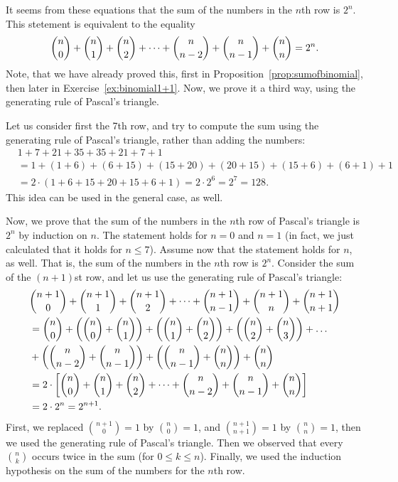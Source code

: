 It seems from these equations that the sum of the numbers in the $n$th row is $2^n$. 
This stetement is equivalent to the equality
\begin{equation} %
\notag \binom{n}{0} + \binom{n}{1} + \binom{n}{2} + \dots + \binom{n}{n-2} + \binom{n}{n-1} + \binom{n}{n} = 2^n. 
\end{equation}
Note, that we have already proved this, first in Proposition~\ref{prop:sumofbinomial}, then later in Exercise~\ref{ex:binomial1+1}.
Now, we prove it a third way, using the generating rule of Pascal's triangle. 

Let us consider first the 7th row, 
and try to compute the sum using the generating rule of Pascal's triangle, 
rather than adding the numbers: 
\begin{align*}
& 1 + 7 + 21 + 35 + 35 + 21 + 7 + 1 \\
&= 1 + (1 + 6) + (6 + 15) + (15 + 20) + (20 + 15) + (15 + 6) + (6 + 1) + 1 \\
&= 2 \cdot (1 + 6 + 15 + 20 + 15 + 6 + 1 ) = 2 \cdot 2^6 = 2^7 = 128. 
\end{align*}
This idea can be used in the general case, as well. 

Now, we prove that the sum of the numbers in the $n$th row of Pascal's triangle is $2^n$ by induction on $n$. 
The statement holds for $n=0$ and $n=1$ (in fact, we just calculated that it holds for $n\leq 7$). 
Assume now that the statement holds for $n$, as well. 
That is, the sum of the numbers in the $n$th row is $2^{n}$. 
Consider the sum of the $(n+1)$st row, 
and let us use the generating rule of Pascal's triangle: 
\begin{align}
\notag & \binom{n+1}{0} + \binom{n+1}{1} + \binom{n+1}{2} + \dots + \binom{n+1}{n-1} + \binom{n+1}{n} + \binom{n+1}{n+1} \\
\notag &= \binom{n}{0} + \left( \binom{n}{0} + \binom{n}{1} \right) + \left( \binom{n}{1} + \binom{n}{2} \right)  + \left( \binom{n}{2} + \binom{n}{3} \right) 
+ \dots \\
\notag &+ %
\left( \binom{n}{n-2} + \binom{n}{n-1} \right)  + \left( \binom{n}{n-1} + \binom{n}{n} \right) + \binom{n}{n} \\
\notag &= 2 \cdot \left[ \binom{n}{0} + \binom{n}{1} + \binom{n}{2} + \dots + \binom{n}{n-2} + \binom{n}{n-1} + \binom{n}{n} \right] \\
\notag &= 2 \cdot 2^{n} = 2^{n+1}.
\end{align}
First, we replaced $\binom{n+1}{0}=1$ by $\binom{n}{0}=1$, 
and $\binom{n+1}{n+1} = 1$ by $\binom{n}{n} = 1$, then we used the generating rule of Pascal's triangle. 
Then we observed that every $\binom{n}{k}$ occurs twice in the sum (for $0\leq k\leq n$). 
Finally, we used the induction hypothesis on the sum of the numbers for the $n$th row.  

